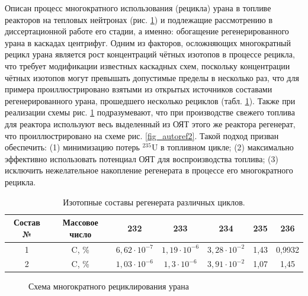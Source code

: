 Описан процесс многократного использования (рецикла) урана в топливе реакторов на тепловых нейтронах (рис. \ref{fig_autoref1}) и подлежащие рассмотрению в диссертационной работе его стадии, а именно: обогащение регенерированного урана в каскадах центрифуг. Одним из факторов, осложняющих многократный рецикл урана является рост концентраций чётных изотопов в процессе рецикла, что требует модификации известных каскадных схем, поскольку концентрации чётных изотопов могут превышать допустимые пределы в несколько раз, что для примера проиллюстрировано взятыми из открытых источников составами регенерированного урана, прошедшего несколько рециклов (табл. \ref{is_compositions_2_5autoref}). Также при реализации схемы рис. \ref{fig_autoref1} подразумевают, что при производстве свежего топлива для реактора используют весь выделенный из ОЯТ этого же реактора регенерат, что проиллюстрировано на схеме рис. \ref{fig_autoref2}.  Такой подход призван обеспечить: (1) минимизацию потерь  $^{235}$U в топливном цикле; (2) максимально эффективно использовать потенциал ОЯТ для воспроизводства топлива; (3) исключить нежелательное накопление регенерата в процессе его многократного рецикла.

\begin{table}[h]
  \centering
  \caption{{Изотопные составы регенерата различных циклов.{\label{is_compositions_2_5autoref}}}}
  \begin{tabular}{|c||c|c|c|c|c|c|}
  \hline Состав № & Массовое число & 232 & 233 & 234 & 235 & 236 \\
  \hline 1 & C, \% & $6,62\cdot10^{-7}$ & $1,19\cdot10^{-6}$ & $3,28\cdot10^{-2}$ & 1,43 & 0,9932 \\
  2 & C, \% &  $1,03\cdot10^{-6}$ & $1,3\cdot10^{-6}$ & $3,91\cdot10^{-2}$ & 1,07 & 1,45 \\\hline
  \end{tabular}
\end{table}

\begin{figure}[ht]
  \caption{Схема многократного рециклирования урана}\label{fig_autoref1}
\end{figure}


